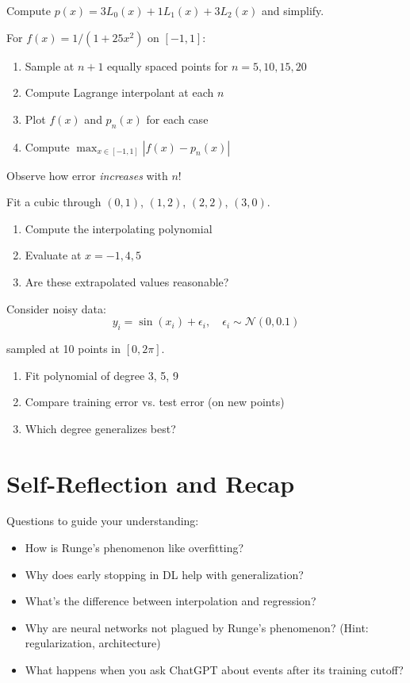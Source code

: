 Compute $p(x) = 3 L_0(x) + 1 L_1(x) + 3 L_2(x)$ and simplify.


\vspace{2em}
 For $f(x) = 1/(1 + 25x^2)$ on $[-1, 1]$:
\begin{enumerate}
    \item Sample at $n+1$ equally spaced points for $n = 5, 10, 15, 20$
    \item Compute Lagrange interpolant at each $n$
    \item Plot $f(x)$ and $p_n(x)$ for each case
    \item Compute $\max_{x \in [-1,1]} |f(x) - p_n(x)|$
\end{enumerate}

Observe how error \emph{increases} with $n$!


\vspace{2em}
 Fit a cubic through $(0, 1)$, $(1, 2)$, $(2, 2)$, $(3, 0)$.
\begin{enumerate}
    \item Compute the interpolating polynomial
    \item Evaluate at $x = -1, 4, 5$
    \item Are these extrapolated values reasonable?
\end{enumerate}


\vspace{2em}
 Consider noisy data:
\begin{equation}
    y_i = \sin(x_i) + \epsilon_i, \quad \epsilon_i \sim \mathcal{N}(0, 0.1)
\end{equation}

sampled at 10 points in $[0, 2\pi]$.
\begin{enumerate}
    \item Fit polynomial of degree 3, 5, 9
    \item Compare training error vs. test error (on new points)
    \item Which degree generalizes best?
\end{enumerate}




\newpage
\section{Self-Reflection and Recap}

 Questions to guide your understanding:
\begin{itemize}
    \item How is Runge's phenomenon like overfitting?
    \item Why does early stopping in DL help with generalization?
    \item What's the difference between interpolation and regression?
    \item Why are neural networks not plagued by Runge's phenomenon? (Hint: regularization, architecture)
    \item What happens when you ask ChatGPT about events after its training cutoff?
\end{itemize}

